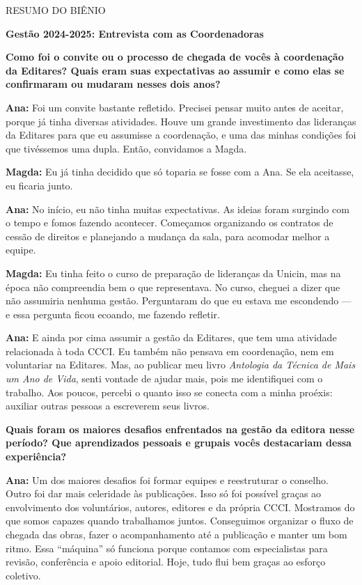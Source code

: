RESUMO DO BIÊNIO

\textbf{Gestão 2024-2025: Entrevista com as Coordenadoras}

\textbf{Como foi o convite ou o processo de chegada de vocês à coordenação da Editares? Quais eram suas expectativas ao assumir e como elas se confirmaram ou mudaram nesses dois anos?}

\textbf{Ana:} Foi um convite bastante refletido. Precisei pensar muito antes de aceitar, porque já tinha diversas atividades. Houve um grande investimento das lideranças da Editares para que eu assumisse a coordenação, e uma das minhas condições foi que tivéssemos uma dupla. Então, convidamos a Magda.

\textbf{Magda:} Eu já tinha decidido que só toparia se fosse com a Ana. Se ela aceitasse, eu ficaria junto.

\textbf{Ana:} No início, eu não tinha muitas expectativas. As ideias foram surgindo com o tempo e fomos fazendo acontecer. Começamos organizando os contratos de cessão de direitos e planejando a mudança da sala, para acomodar melhor a equipe.

\textbf{Magda:} Eu tinha feito o curso de preparação de lideranças da Unicin, mas na época não compreendia bem o que representava. No curso, cheguei a dizer que não assumiria nenhuma gestão. Perguntaram do que eu estava me escondendo --- e essa pergunta ficou ecoando, me fazendo refletir.

\textbf{Ana:} E ainda por cima assumir a gestão da Editares, que tem uma atividade relacionada à toda CCCI. Eu também não pensava em coordenação, nem em voluntariar na Editares. Mas, ao publicar meu livro \emph{Antologia da Técnica de Mais um Ano de Vida}, senti vontade de ajudar mais, pois me identifiquei com o trabalho. Aos poucos, percebi o quanto isso se conecta com a minha proéxis: auxiliar outras pessoas a escreverem seus livros.

\textbf{Quais foram os maiores desafios enfrentados na gestão da editora nesse período? Que aprendizados pessoais e grupais vocês destacariam dessa experiência?}

\textbf{Ana:} Um dos maiores desafios foi formar equipes e reestruturar o conselho. Outro foi dar mais celeridade às publicações. Isso só foi possível graças ao envolvimento dos voluntários, autores, editores e da própria CCCI. Mostramos do que somos capazes quando trabalhamos juntos. Conseguimos organizar o fluxo de chegada das obras, fazer o acompanhamento até a publicação e manter um bom ritmo. Essa ``máquina'' só funciona porque contamos com especialistas para revisão, conferência e apoio editorial. Hoje, tudo flui bem graças ao esforço coletivo.

